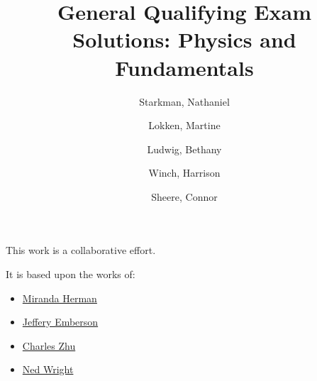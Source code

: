 \documentclass[\main/main.tex]{subfiles}
\title{General Qualifying Exam Solutions: Physics and Fundamentals\\}
\author{{Starkman}, Nathaniel \\%
		\and {Lokken}, Martine \\%
		\and {Ludwig}, Bethany \\%
		\and {Winch}, Harrison \\%
		\and {Sheere}, Connor
}
\begin{document}
This work is a collaborative effort.

It is based upon the works of:

\begin{itemize}
	\item \href{https://github.com/mkherman/Quals2018/}{Miranda Herman}
	\item \href{http://www.astro.utoronto.ca/~cczhu/EmbersonQual.pdf}{Jeffery Emberson}
	\item \href{http://www.astro.utoronto.ca/~cczhu/ZhuQual.pdf}{Charles Zhu}
	\item \href{http://www.astro.ucla.edu/~wright/cosmolog.htm}{Ned Wright}
\end{itemize}
\end{document}
